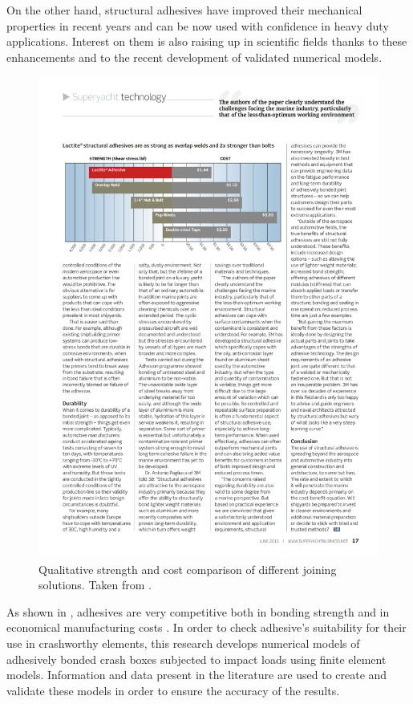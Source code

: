 \documentclass[cmfonts]{witpress}
\begin{document}
On the other hand, structural adhesives have improved their mechanical properties in recent years and can be now used with confidence in heavy duty applications. Interest on them is also raising up in scientific fields thanks to these enhancements and to the recent development of validated numerical models.
\begin{figure}[htpb]
	\centering
	\includegraphics[width=\linewidth]{./figures/IMG_CUTRES/comparison}
	\caption[Qualitative strength and cost comparison of different joining solutions.]{Qualitative strength and cost comparison of different joining solutions. Taken from \cite{superyacht}.}
	\label{fig:comparison}
\end{figure}

As shown in , adhesives are very competitive both in bonding strength and in economical manufacturing costs \cite{superyacht}. In order to check adhesive's suitability for their use in crashworthy elements, this research develops numerical models of adhesively bonded crash boxes subjected to impact loads using finite element models. Information and data present in the literature are used to create and validate these models in order to ensure the accuracy of the results.
\end{document}
